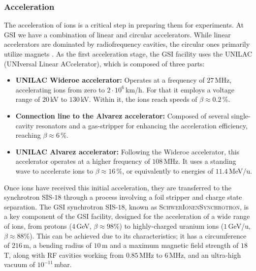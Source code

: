 \subsubsection{Acceleration}\label{subsubsec:chap2:accelerators}
The acceleration of ions is a critical step in preparing them for experiments. At \textsc{GSI} we have a combination of linear and circular accelerators. While linear accelerators are dominated by radiofrequency cavities, the circular ones primarily utilize magnets \cite{Conte}.
\newpar
As the first acceleration stage, the \textsc{GSI} facility uses the \textsc{UNILAC} (UNIversal Linear ACcelerator), which is composed of three parts:
\begin{itemize}
    \item \textbf{\textsc{UNILAC} Wideroe accelerator:} Operates at a frequency of $27$\,MHz, accelerating ions from zero to $2\cdot10^{6}$\,km/h. For that it employs a voltage range of $20$\,kV to $130$\,kV. Within it, the ions reach speeds of $\beta \approx 0.2$\,\%.
    \item \textbf{Connection line to the Alvarez accelerator:} Composed of several single-cavity resonators and a gas-stripper for enhancing the acceleration efficiency, reaching $\beta \approx 6$\,\%.
    \item \textbf{\textsc{UNILAC} Alvarez accelerator:} Following the Wideroe accelerator, this accelerator operates at a higher frequency of $108$\,MHz. It uses a standing wave to accelerate ions to $\beta \approx 16$\,\%, or equivalently to energies of $11.4$\,MeV/u.
\end{itemize}

Once ions have received this initial acceleration, they are transferred to the synchrotron \textsc{SIS-$18$} through a process involving a foil stripper and charge state separation. 
\newpar
The \textsc{GSI} synchrotron \textsc{SIS-$18$}, known as \textsc{SchwerIonenSynchrotron}, is a key component of the \textsc{GSI} facility, designed for the acceleration of a wide range of ions, from protons ($4$\,GeV, $\beta \approx 98$\%) to highly-charged uranium ions ($1$\,GeV/u, $\beta \approx 88$\%). This can be achieved due to its characteristics; it has a circumference of $216$\,m, a bending radius of $10$\,m and a maximum magnetic field strength of $18$\,T, along with RF cavities working from $0.85$\,MHz to $6$\,MHz, and an ultra-high vacuum of $10^{-11}$\,mbar. 

